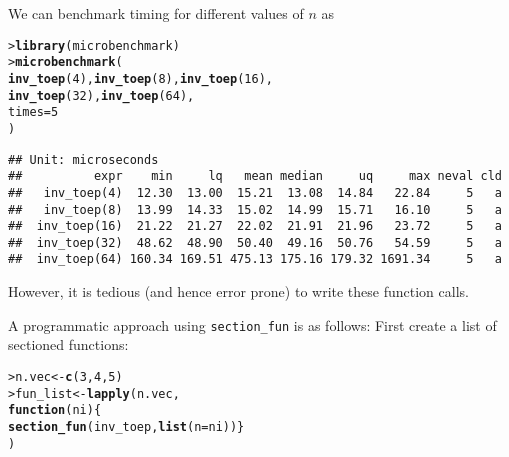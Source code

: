 \documentclass[11pt]{article}\usepackage[]{graphicx}\usepackage[]{xcolor}
\makeatletter
\newcommand{\hlnum}[1]{\textcolor[rgb]{0.686,0.059,0.569}{#1}}%
\newcommand{\hlstd}[1]{\textcolor[rgb]{0.345,0.345,0.345}{#1}}%
\newcommand{\hlkwa}[1]{\textcolor[rgb]{0.161,0.373,0.58}{\textbf{#1}}}%
\newcommand{\hlkwb}[1]{\textcolor[rgb]{0.69,0.353,0.396}{#1}}%
\newcommand{\hlkwc}[1]{\textcolor[rgb]{0.333,0.667,0.333}{#1}}%
\newcommand{\hlkwd}[1]{\textcolor[rgb]{0.737,0.353,0.396}{\textbf{#1}}}%
\newenvironment{kframe}{%
 \def\at@end@of@kframe{}%
 \ifinner\ifhmode%
  \def\at@end@of@kframe{\end{minipage}}%
  \begin{minipage}{\columnwidth}%
 \fi\fi%
 \def\FrameCommand##1{\hskip\@totalleftmargin \hskip-\fboxsep
 \colorbox{shadecolor}{##1}\hskip-\fboxsep
     \hskip-\linewidth \hskip-\@totalleftmargin \hskip\columnwidth}%
 \MakeFramed {\advance\hsize-\width
   \@totalleftmargin\z@ \linewidth\hsize
   \@setminipage}}%
 {\par\unskip\endMakeFramed%
 \at@end@of@kframe}
\newenvironment{knitrout}{}{} %
\def\code#1{\texttt{#1}}
\makeatother
\begin{document}
We can benchmark timing for different values of $n$ as
\begin{knitrout}
\color{fgcolor}\begin{kframe}
\begin{alltt}
\hlstd{> }\hlkwd{library}\hlstd{(microbenchmark)}
\hlstd{> }\hlkwd{microbenchmark}\hlstd{(}
\hlstd{  }    \hlkwd{inv_toep}\hlstd{(}\hlnum{4}\hlstd{),} \hlkwd{inv_toep}\hlstd{(}\hlnum{8}\hlstd{),} \hlkwd{inv_toep}\hlstd{(}\hlnum{16}\hlstd{),}
\hlstd{  }    \hlkwd{inv_toep}\hlstd{(}\hlnum{32}\hlstd{),} \hlkwd{inv_toep}\hlstd{(}\hlnum{64}\hlstd{),}
\hlstd{  }    \hlkwc{times}\hlstd{=}\hlnum{5}
\hlstd{  }\hlstd{)}
\end{alltt}
\begin{verbatim}
## Unit: microseconds
##          expr    min     lq   mean median     uq     max neval cld
##   inv_toep(4)  12.30  13.00  15.21  13.08  14.84   22.84     5   a
##   inv_toep(8)  13.99  14.33  15.02  14.99  15.71   16.10     5   a
##  inv_toep(16)  21.22  21.27  22.02  21.91  21.96   23.72     5   a
##  inv_toep(32)  48.62  48.90  50.40  49.16  50.76   54.59     5   a
##  inv_toep(64) 160.34 169.51 475.13 175.16 179.32 1691.34     5   a
\end{verbatim}
\end{kframe}
\end{knitrout}

However, it is tedious (and hence error prone) to write these function calls. 

A programmatic approach using \code{section\_fun} is as follows: First create a list of sectioned functions:
\begin{knitrout}
\color{fgcolor}\begin{kframe}
\begin{alltt}
\hlstd{> }\hlstd{n.vec}  \hlkwb{<-} \hlkwd{c}\hlstd{(}\hlnum{3}\hlstd{,} \hlnum{4}\hlstd{,} \hlnum{5}\hlstd{)}
\hlstd{> }\hlstd{fun_list} \hlkwb{<-} \hlkwd{lapply}\hlstd{(n.vec,}
\hlstd{  }                  \hlkwa{function}\hlstd{(}\hlkwc{ni}\hlstd{)\{}
\hlstd{  }                      \hlkwd{section_fun}\hlstd{(inv_toep,} \hlkwd{list}\hlstd{(}\hlkwc{n}\hlstd{=ni))\}}
\hlstd{  }                  \hlstd{)}
\end{alltt}
\end{kframe}
\end{knitrout}
\end{document}
